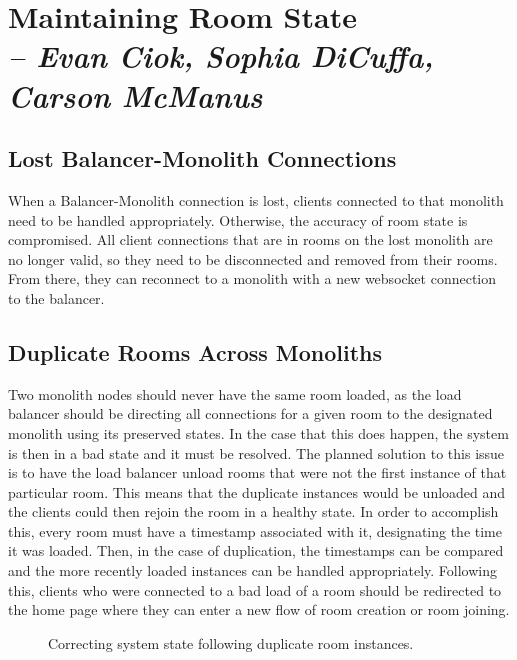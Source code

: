 \chapter{Maintaining Room State \\
  \small{\textit{-- Evan Ciok, Sophia DiCuffa, Carson McManus}}
  \label{Chapter::RoomState}}

\section{Lost Balancer-Monolith Connections}

When a Balancer-Monolith connection is lost, clients connected to that monolith need to be handled appropriately. Otherwise, the accuracy of room state is compromised. 
All client connections that are in rooms on the lost monolith are no longer valid, so they need to be disconnected and removed 
from their rooms. From there, they can reconnect to a monolith with a new websocket connection to the balancer. 

\section{Duplicate Rooms Across Monoliths}

Two monolith nodes should never have the same room loaded, as the load balancer should be directing all connections for a given room to the designated monolith using its preserved states. 
In the case that this does happen, the system is then in a bad state and it must be resolved. The planned solution to this issue is to have the load balancer unload rooms that were not the 
first instance of that particular room. This means that the duplicate instances would be unloaded and the clients could then rejoin the room in a healthy state. In order to accomplish this, 
every room must have a timestamp associated with it, designating the time it was loaded. Then, in the case of duplication, the timestamps can be compared and the more recently loaded 
instances can be handled appropriately. Following this, clients who were connected to a bad load of a room should be redirected to the home page where they can enter a new flow of room 
creation or room joining. 

\begin{figure}[!htb]
  \centering
  \caption{\label{Figure::duplicate-rooms} Correcting system state following duplicate room instances.}
\end{figure}